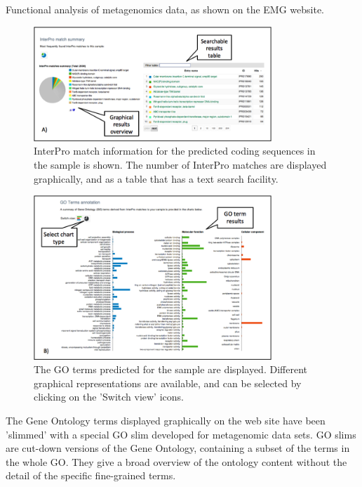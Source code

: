 Functional analysis of metagenomics data, as shown on the EMG website.

\begin{figure}[Figure 4]
\centering
\includegraphics[width=0.8\textwidth]{handout/FA_Interpro.png}
\caption{ InterPro match information for the predicted coding sequences in the sample is shown. The number of InterPro matches are displayed graphically, and as a table that has a text search facility.}
\label{fig:FA_Interpro}
\end{figure}

\begin{figure}[Figure 5]
\centering
\includegraphics[width=0.8\textwidth]{handout/FA_GO.png}
\caption{ The GO terms predicted for the sample are displayed. Different graphical representations are available, and can be selected by clicking on the 'Switch view' icons.}
\label{fig:FA_GO}
\end{figure}

The Gene Ontology terms displayed graphically on the web site have been 'slimmed' with a special GO slim developed for metagenomic data sets. GO slims are cut-down versions of the Gene Ontology, containing a subset of the terms in the whole GO. They give a broad overview of the ontology content without the detail of the specific fine-grained terms.

